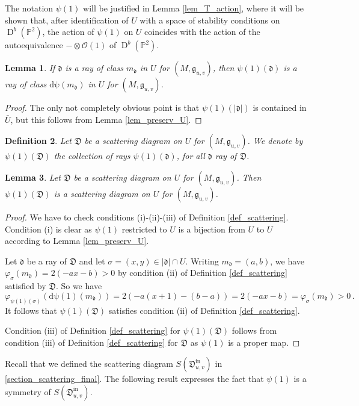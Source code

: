 \documentclass[12pt, a4paper]{amsart}
\newtheorem{defn}{Definition}[section]
\newtheorem{lem}[defn]{Lemma}
\newcommand\PP{\mathbb P}
\newcommand\cO{\mathcal O}
\newcommand\fd{\mathfrak d}
\newcommand\fD{\mathfrak D}
\newcommand\fg{\mathfrak g}
\newcommand\D{\operatorname{D}}
\newcommand\iin{\mathrm{in}}
\begin{document}
The notation $\psi(1)$ will be justified in
Lemma \ref{lem_T_action}, where it will be shown that, after identification of $U$
with a space of stability conditions on 
$\D^b(\PP^2)$, the action of $\psi(1)$ on $U$ coincides with the action of the autoequivalence $- \otimes \cO(1)$
of $\D^b(\PP^2)$.

\begin{lem}
If $\fd$ is a ray of class $m_\fd$ in 
$U$ for $(M, \fg_{u,v})$, then $\psi(1)(\fd)$ is a ray of class 
$\mathrm{d\psi}(m_\fd)$ in $U$ for $(M, \fg_{u,v})$.
\end{lem}

\begin{proof}
The only not completely obvious point is that $\psi(1)(|\fd|)$ is contained in 
$\bar{U}$, but this follows from Lemma
\ref{lem_preserv_U}.
\end{proof}

\begin{defn}
Let $\fD$ be a scattering diagram on $U$ for $(M,\fg_{u,v})$. We denote by
$\psi(1)(\fD)$ the collection of rays 
$\psi(1)(\fd)$, for all $\fd$ ray of 
$\fD$.
\end{defn}

\begin{lem}
Let $\fD$ be a scattering diagram on 
$U$ for 
$(M,\fg_{u,v})$.
Then $\psi(1)(\fD)$ is a scattering diagram on $U$ for 
$(M,\fg_{u,v})$.
\end{lem}

\begin{proof}
We have to check conditions (i)-(ii)-(iii) 
of Definition \ref{def_scattering}.
Condition (i) is clear as $\psi(1)$ restricted to $U$ is a bijection from $U$ to $U$ according to Lemma \ref{lem_preserv_U}.

Let $\fd$ be a ray of $\fD$ and let 
$\sigma=(x,y) \in |\fd| \cap U$. Writing 
$m_\fd=(a,b)$, we have 
$\varphi_\sigma(m_\fd)
=2(-ax-b)>0$ by condition (ii) of Definition
\ref{def_scattering} satisfied by $\fD$.
So we have
\[ \varphi_{\psi(1)(\sigma)}
(\mathrm{d\psi}(1)(m_\fd))
=2(-a(x+1)-(b-a))=2(-ax-b) 
=\varphi_\sigma(m_\fd)>0\,.\]
It follows that 
$\psi(1)(\fD)$ satisfies condition 
(ii) of Definition \ref{def_scattering}.

Condition (iii) of Definition \ref{def_scattering} for $\psi(1)(\fD)$ follows from condition (iii) of Definition \ref{def_scattering} for $\fD$ as $\psi(1)$ is a proper map.
\end{proof}

Recall that we defined the scattering diagram $S(\fD^\iin_{u,v})$ in 
\cref{section_scattering_final}. The following result expresses the fact that $\psi(1)$ is a symmetry of 
$S(\fD^\iin_{u,v})$.
\end{document}
